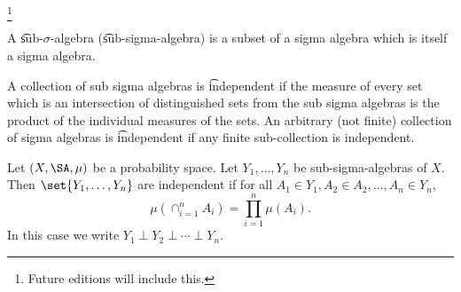 
  \ifhmode\unskip\fi\footnote{
Future editions will include this.
  }


A \t{sub-$\sigma $-algebra} (\t{sub-sigma-algebra}) is a subset of a sigma algebra which is itself a sigma algebra.

A collection of sub sigma algebras is \t{independent} if the measure
of every set which is an intersection of distinguished sets from the sub sigma algebras is the product of the individual measures of the sets.
An arbitrary (not finite) collection of sigma algebras is \t{independent}
if any finite sub-collection is independent.


Let $(X, \SA, \mu )$ be a probability space.
Let $Y_1, \dots, Y_n$ be sub-sigma-algebras of $X$.
Then $\set{Y_1, \dots, Y_n}$ are independent if for all $A_1 \in Y_1, A_2 \in A_2, \dots, A_n \in Y_n$,
  \[
\mu (\cap_{i = 1}^{n} A_i) = \prod_{i = 1}^{n} \mu (A_i).
  \]
In this case we write $Y_1 \perp Y_2 \perp \cdots \perp Y_n$.

\blankpage

